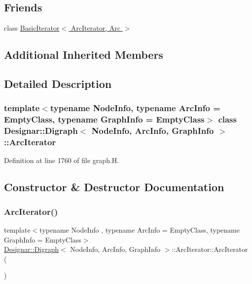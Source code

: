 \subsection*{Friends}
\begin{DoxyCompactItemize}
\item 
class \hyperlink{class_designar_1_1_digraph_1_1_arc_iterator_a530ad7c7218fa9b74a5cce004d0e3a1c}{Basic\+Iterator$<$ Arc\+Iterator, Arc $>$}
\end{DoxyCompactItemize}
\subsection*{Additional Inherited Members}


\subsection{Detailed Description}
\subsubsection*{template$<$typename Node\+Info, typename Arc\+Info = Empty\+Class, typename Graph\+Info = Empty\+Class$>$\newline
class Designar\+::\+Digraph$<$ Node\+Info, Arc\+Info, Graph\+Info $>$\+::\+Arc\+Iterator}



Definition at line 1760 of file graph.\+H.



\subsection{Constructor \& Destructor Documentation}
\mbox{\label{class_designar_1_1_digraph_1_1_arc_iterator_a0f540c556301e1d4e0a9d48433257b89}} 
\subsubsection{\texorpdfstring{Arc\+Iterator()}{ArcIterator()}\hspace{0.1cm}{\footnotesize\ttfamily [1/5]}}
{\footnotesize\ttfamily template$<$typename Node\+Info , typename Arc\+Info  = Empty\+Class, typename Graph\+Info  = Empty\+Class$>$ \\
\hyperlink{class_designar_1_1_digraph}{Designar\+::\+Digraph}$<$ Node\+Info, Arc\+Info, Graph\+Info $>$\+::Arc\+Iterator\+::\+Arc\+Iterator (\begin{DoxyParamCaption}{ }\end{DoxyParamCaption})\hspace{0.3cm}{\ttfamily [inline]}}



